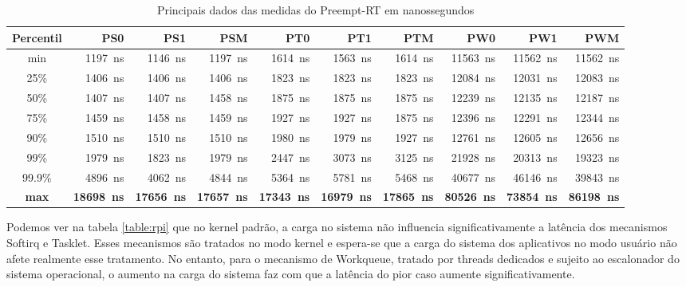 \begin{table}[!htb]
\tiny
\centering
\begin{center}
\begin{tabular}{|c|r|r|r|r|r|r|r|r|r|}
\toprule
Percentil &    PS0 &    PS1 &    PSM &    PT0 &    PT1 &    PTM &    PW0 &     PW1 &    PWM \\
\midrule
  min  &   \SI{1197}{ns} &   \SI{1146}{ns} &   \SI{1197}{ns} &   \SI{1614}{ns} &   \SI{1563}{ns} &   \SI{1614}{ns} &  \SI{11563}{ns} &  \SI{11562}{ns} &  \SI{11562}{ns} \\
  25\% &   \SI{1406}{ns} &   \SI{1406}{ns} &   \SI{1406}{ns} &   \SI{1823}{ns} &   \SI{1823}{ns} &   \SI{1823}{ns} &  \SI{12084}{ns} &  \SI{12031}{ns} &  \SI{12083}{ns} \\
  50\% &   \SI{1407}{ns} &   \SI{1407}{ns} &   \SI{1458}{ns} &   \SI{1875}{ns} &   \SI{1875}{ns} &   \SI{1875}{ns} &  \SI{12239}{ns} &  \SI{12135}{ns} &  \SI{12187}{ns} \\
  75\% &   \SI{1459}{ns} &   \SI{1458}{ns} &   \SI{1459}{ns} &   \SI{1927}{ns} &   \SI{1927}{ns} &   \SI{1875}{ns} &  \SI{12396}{ns} &  \SI{12291}{ns} &  \SI{12344}{ns} \\
  90\% &   \SI{1510}{ns} &   \SI{1510}{ns} &   \SI{1510}{ns} &   \SI{1980}{ns} &   \SI{1979}{ns} &   \SI{1927}{ns} &  \SI{12761}{ns} &  \SI{12605}{ns} &  \SI{12656}{ns} \\
  99\% &   \SI{1979}{ns} &   \SI{1823}{ns} &   \SI{1979}{ns} &   \SI{2447}{ns} &   \SI{3073}{ns} &   \SI{3125}{ns} &  \SI{21928}{ns} &  \SI{20313}{ns} &  \SI{19323}{ns} \\
99.9\% &   \SI{4896}{ns} &   \SI{4062}{ns} &   \SI{4844}{ns} &   \SI{5364}{ns} &   \SI{5781}{ns} &   \SI{5468}{ns} &  \SI{40677}{ns} &  \SI{46146}{ns} &  \SI{39843}{ns} \\
\textbf{max} &  \textbf{\SI{18698}{ns}} &  \textbf{\SI{17656}{ns}} &  \textbf{\SI{17657}{ns}} &  \textbf{\SI{17343}{ns}} &  \textbf{\SI{16979}{ns}} &  \textbf{\SI{17865}{ns}} &  \textbf{\SI{80526}{ns}} &  \textbf{\SI{73854}{ns}} &  \textbf{\SI{86198}{ns}} \\
\bottomrule
\end{tabular}
\end{center}
\caption{Principais dados das medidas do Preempt-RT em nanossegundos}
\label{table:prt}
\end{table}

Podemos ver na tabela \ref{table:rpi} que no kernel padrão, a carga no sistema não influencia significativamente a latência dos mecanismos Softirq e Tasklet. Esses mecanismos são tratados no modo kernel e espera-se que a carga do sistema dos aplicativos no modo usuário não afete realmente esse tratamento. No entanto, para o mecanismo de Workqueue, tratado por threads dedicados e sujeito ao escalonador do sistema operacional, o aumento na carga do sistema faz com que a latência do pior caso aumente significativamente.

